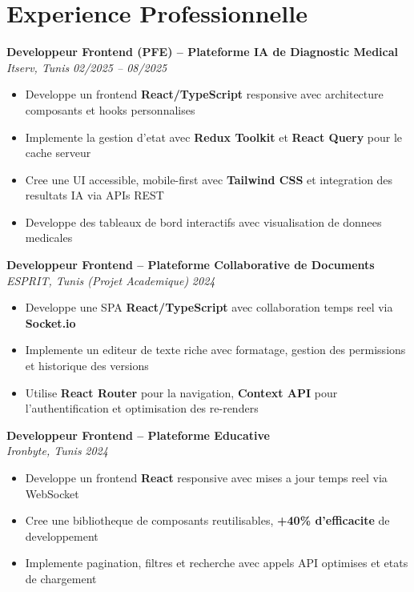 \documentclass[10pt,a4paper]{article}
\begin{document}
\vspace{6pt}

\section*{Experience Professionnelle}
{\small

\textbf{Developpeur Frontend (PFE) -- Plateforme IA de Diagnostic Medical}\\[1pt]
\textit{Itserv, Tunis} \hfill \textit{02/2025 -- 08/2025}
\begin{itemize}
  \item Developpe un frontend \textbf{React/TypeScript} responsive avec architecture composants et hooks personnalises
  \item Implemente la gestion d'etat avec \textbf{Redux Toolkit} et \textbf{React Query} pour le cache serveur
  \item Cree une UI accessible, mobile-first avec \textbf{Tailwind CSS} et integration des resultats IA via APIs REST
  \item Developpe des tableaux de bord interactifs avec visualisation de donnees medicales
\end{itemize}

\vspace{3pt}
\textbf{Developpeur Frontend -- Plateforme Collaborative de Documents}\\[1pt]
\textit{ESPRIT, Tunis (Projet Academique)} \hfill \textit{2024}
\begin{itemize}
  \item Developpe une SPA \textbf{React/TypeScript} avec collaboration temps reel via \textbf{Socket.io}
  \item Implemente un editeur de texte riche avec formatage, gestion des permissions et historique des versions
  \item Utilise \textbf{React Router} pour la navigation, \textbf{Context API} pour l'authentification et optimisation des re-renders
\end{itemize}

\vspace{3pt}
\textbf{Developpeur Frontend -- Plateforme Educative}\\[1pt]
\textit{Ironbyte, Tunis} \hfill \textit{2024}
\begin{itemize}
  \item Developpe un frontend \textbf{React} responsive avec mises a jour temps reel via WebSocket
  \item Cree une bibliotheque de composants reutilisables, \textbf{+40\% d'efficacite} de developpement
  \item Implemente pagination, filtres et recherche avec appels API optimises et etats de chargement
\end{itemize}

}
\end{document}
